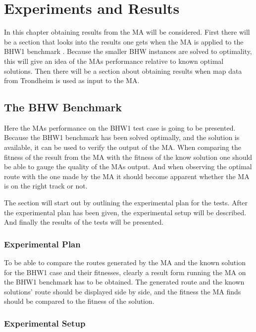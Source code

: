 \chapter{Experiments and Results}
\label{cha:experiments_and_results}

In this chapter obtaining results from the MA will be considered. First there will be a section that looks into the results one gets when the MA is applied to the BHW1 benchmark \citep{BHWdocumentationSINTEF}. Because the smaller BHW instances are solved to optimality, this will give an idea of the MAs performance relative to known optimal solutions. Then there will be a section about obtaining results when map data from Trondheim is used as input to the MA.

\section{The BHW Benchmark}
\label{sec:the_bhw_benchmark}

Here the MAs performance on the BHW1 test case is going to be presented. Because the BHW1 benchmark has been solved optimally, and the solution is available, it can be used to verify the output of the MA. When comparing the fitness of the result from the MA with the fitness of the know solution one should be able to gauge the quality of the MAs output. And when observing the optimal route with the one made by the MA it should become apparent whether the MA is on the right track or not.

The section will start out by outlining the experimental plan for the tests. After the experimental plan has been given, the experimental setup will be described. And finally the results of the tests will be presented.

\subsection{Experimental Plan}

To be able to compare the routes generated by the MA and the known solution for the BHW1 case and their fitnesses, clearly a result form running the MA on the BHW1 benchmark has to be obtained. The generated route and the known solutions' route should be displayed side by side, and the fitness the MA finds should be compared to the fitness of the solution.

\subsection{Experimental Setup}

